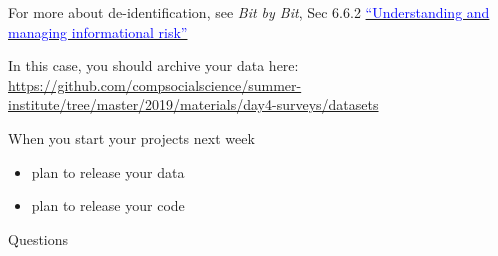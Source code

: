\documentclass[aspectratio=169]{beamer}
\begin{document}
\begin{frame}

For more about de-identification, see \textit{Bit by Bit}, Sec 6.6.2 \href{https://www.bitbybitbook.com/en/1st-ed/ethics/dilemmas/info-risk/}{\textcolor{blue}{``Understanding and managing informational risk''}}

\end{frame}
\begin{frame}

In this case, you should archive your data here:\\
\url{https://github.com/compsocialscience/summer-institute/tree/master/2019/materials/day4-surveys/datasets}

\end{frame}
\begin{frame}

When you start your projects next week
\begin{itemize}
\item plan to release your data
\item plan to release your code
\end{itemize}

\end{frame}
\begin{frame}

\begin{center}
\LARGE Questions
\end{center}

\end{frame}
\end{document}
